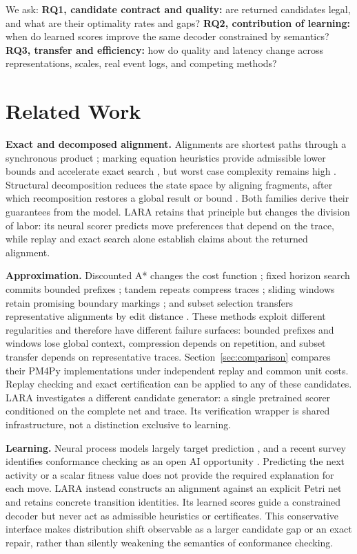 \documentclass[manuscript,screen,nonacm]{acmart}
\begin{document}
We ask: \textbf{RQ1, candidate contract and quality:} are returned candidates legal, and what are their optimality rates and gaps? \textbf{RQ2, contribution of learning:} when do learned scores improve the same decoder constrained by semantics? \textbf{RQ3, transfer and efficiency:} how do quality and latency change across representations, scales, real event logs, and competing methods?

\section{Related Work}
\label{sec:relatedWork}

\textbf{Exact and decomposed alignment.} Alignments are shortest paths through a synchronous product \cite{Zelst2018}; marking equation heuristics provide admissible lower bounds and accelerate exact search \cite{Dongen2018}, but worst case complexity remains high \cite{Schwanen2026}. Structural decomposition reduces the state space by aligning fragments, after which recomposition restores a global result or bound \cite{Aalst2013,Lee2018}. Both families derive their guarantees from the model. LARA retains that principle but changes the division of labor: its neural scorer predicts move preferences that depend on the trace, while replay and exact search alone establish claims about the returned alignment.

\textbf{Approximation.} Discounted A* changes the cost function \cite{Boltenhagen2021}; fixed horizon search commits bounded prefixes \cite{Dongen2017}; tandem repeats compress traces \cite{ReissnerTandem2020}; sliding windows retain promising boundary markings \cite{Bogdanov2024}; and subset selection transfers representative alignments by edit distance \cite{FaniSani2020}. These methods exploit different regularities and therefore have different failure surfaces: bounded prefixes and windows lose global context, compression depends on repetition, and subset transfer depends on representative traces. Section~\ref{sec:comparison} compares their PM4Py implementations under independent replay and common unit costs. Replay checking and exact certification can be applied to any of these candidates. LARA investigates a different candidate generator: a single pretrained scorer conditioned on the complete net and trace. Its verification wrapper is shared infrastructure, not a distinction exclusive to learning.

\textbf{Learning.} Neural process models largely target prediction \cite{Bukhsh2021}, and a recent survey identifies conformance checking as an open AI opportunity \cite{Genga2025}. Predicting the next activity or a scalar fitness value does not provide the required explanation for each move. LARA instead constructs an alignment against an explicit Petri net and retains concrete transition identities. Its learned scores guide a constrained decoder but never act as admissible heuristics or certificates. This conservative interface makes distribution shift observable as a larger candidate gap or an exact repair, rather than silently weakening the semantics of conformance checking.
\end{document}
